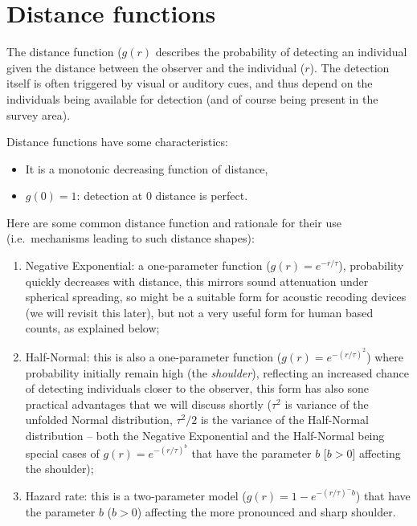 \documentclass[12pt,]{book}
\providecommand{\tightlist}{%
  \setlength{\itemsep}{0pt}\setlength{\parskip}{0pt}}
\begin{document}
\hypertarget{distance-functions}{%
\section{Distance functions}\label{distance-functions}}

The distance function (\(g(r)\) describes the probability of detecting an individual
given the distance between the observer and the individual (\(r\)).
The detection itself is often triggered by visual or auditory cues,
and thus depend on the individuals being available for detection
(and of course being present in the survey area).

Distance functions have some characteristics:

\begin{itemize}
\tightlist
\item
  It is a monotonic decreasing function of distance,
\item
  \(g(0)=1\): detection at 0 distance is perfect.
\end{itemize}

Here are some common distance function and rationale for their use
(i.e.~mechanisms leading to such distance shapes):

\begin{enumerate}
\def\labelenumi{\arabic{enumi}.}
\tightlist
\item
  Negative Exponential: a one-parameter function (\(g(r) = e^{-r/\tau}\)), probability quickly decreases with distance, this mirrors sound attenuation under spherical spreading, so might be a suitable form for acoustic recoding devices (we will revisit this later), but not a very useful form for human based counts, as explained below;
\item
  Half-Normal: this is also a one-parameter function (\(g(r) = e^{-(r/\tau)^2}\)) where probability initially remain high (the \emph{shoulder}), reflecting an increased chance of detecting individuals closer to the observer, this form has also sone practical advantages that we will discuss shortly (\(\tau^2\) is variance of the unfolded Normal distribution, \(\tau^2/2\) is the variance of the Half-Normal distribution -- both the Negative Exponential and the Half-Normal being special cases of \(g(r) = e^{-(r/\tau)^b}\) that have the parameter \(b\) {[}\(b > 0\){]} affecting the shoulder);
\item
  Hazard rate: this is a two-parameter model (\(g(r) = 1-e^{-(r/\tau)^-b}\)) that have the parameter \(b\) (\(b > 0\)) affecting the more pronounced and sharp shoulder.
\end{enumerate}
\end{document}
